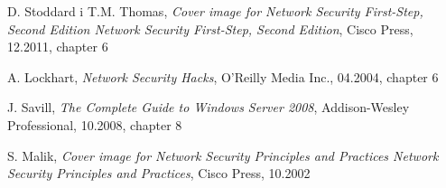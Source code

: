 \documentclass[12p]{article}
\begin{document}
\newpage
\begin{thebibliography}{99}

 D. Stoddard i T.M. Thomas,
\emph{
Cover image for Network Security First-Step, Second Edition
Network Security First-Step, Second Edition},
Cisco Press, 12.2011, chapter 6

 A. Lockhart,
\emph{Network Security Hacks},
O'Reilly Media Inc., 04.2004, chapter 6

 J. Savill,
\emph{The Complete Guide to Windows Server 2008},
Addison-Wesley Professional, 10.2008, chapter 8

 S. Malik,
\emph{Cover image for Network Security Principles and Practices
Network Security Principles and Practices},
Cisco Press, 10.2002

\end{thebibliography}
\newpage
\listoffigures
{}
\end{document}
